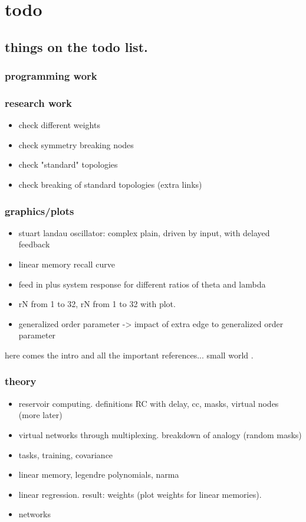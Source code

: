 \chapter{todo}

\section{things on the todo list.}

\subsection{programming work}

\subsection{research work}
\begin{itemize}
    \item check different weights
    \item check symmetry breaking nodes
    \item check "standard" topologies
    \item check breaking of standard topologies (extra links)
\end{itemize}

\subsection{graphics/plots}
\begin{itemize}
	\item stuart landau oscillator: complex plain, driven by input, with delayed feedback
	\item linear memory recall curve
    \item feed in plus system response for different ratios of theta and lambda
    \item rN from 1 to 32, rN from 1 to 32 with plot.
    \item generalized order parameter -> impact of extra edge to generalized order parameter
    
\end{itemize}

here comes the intro and all the important references...
small world \cite{WAT98}.

\subsection{theory}
	\begin{itemize}
		\item reservoir computing. definitions RC with delay, cc, masks, virtual nodes (more later)
		\item virtual networks through multiplexing. breakdown of analogy (random masks)
		\item tasks, training, covariance
		\item linear memory, legendre polynomials, narma
		\item linear regression. result: weights (plot weights for linear memories).
		\item networks
	\end{itemize}

